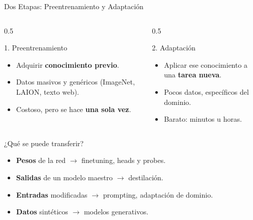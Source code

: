 \documentclass[aspectratio=169, 10pt]{beamer}
\begin{document}
\begin{frame}{Dos Etapas: Preentrenamiento y Adaptaci\'on}

	\begin{columns}[T]
		\begin{column}{0.5\textwidth}
			\begin{block}{1. Preentrenamiento}
				\begin{itemize}
					\item Adquirir \textbf{conocimiento previo}.
					\item Datos masivos y gen\'ericos (ImageNet, LAION, texto web).
					\item Costoso, pero se hace \textbf{una sola vez}.
				\end{itemize}
			\end{block}
		\end{column}

		\begin{column}{0.5\textwidth}
			\begin{block}{2. Adaptaci\'on}
				\begin{itemize}
					\item Aplicar ese conocimiento a una \textbf{tarea nueva}.
					\item Pocos datos, espec\'ificos del dominio.
					\item Barato: minutos u horas.
				\end{itemize}
			\end{block}
		\end{column}
	\end{columns}

	\vspace{0.4cm}

	\begin{block}{¿Qu\'e se puede transferir?}
		\begin{itemize}
			\item \textbf{Pesos} de la red $\to$ finetuning, heads y probes.
			\item \textbf{Salidas} de un modelo maestro $\to$ destilaci\'on.
			\item \textbf{Entradas} modificadas $\to$ prompting, adaptaci\'on de dominio.
			\item \textbf{Datos} sint\'eticos $\to$ modelos generativos.
		\end{itemize}
	\end{block}

\end{frame}

\end{document}
